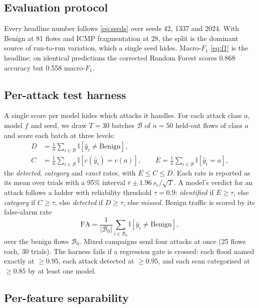 \documentclass[conference]{IEEEtran}
\begin{document}
\subsection{Evaluation protocol}

Every headline number follows \eqref{eq:seeds} over seeds 42, 1337 and 2024. With Benign at 81 flows and ICMP fragmentation at 28, the split is the dominant source of run-to-run variation, which a single seed hides. Macro-$F_1$ \eqref{eq:f1} is the headline: on identical predictions the corrected Random Forest scores 0.868 accuracy but 0.558 macro-$F_1$.

\subsection{Per-attack test harness}

A single score per model hides which attacks it handles. For each attack class $a$, model $f$ and seed, we draw $T = 30$ batches $\mathcal{B}$ of $n = 50$ held-out flows of class $a$ and score each batch at three levels:
\begin{align}
D &= \frac{1}{n}\sum_{i\in\mathcal{B}} \mathbb{I}[\hat{y}_i \ne \text{Benign}], \nonumber\\
C &= \frac{1}{n}\sum_{i\in\mathcal{B}} \mathbb{I}[c(\hat{y}_i) = c(a)], \qquad
E = \frac{1}{n}\sum_{i\in\mathcal{B}} \mathbb{I}[\hat{y}_i = a],
\label{eq:levels}
\end{align}
the \emph{detected}, \emph{category} and \emph{exact} rates, with $E \le C \le D$. Each rate is reported as its mean over trials with a 95\% interval $\bar{r} \pm 1.96\, s_r/\sqrt{T}$. A model's verdict for an attack follows a ladder with reliability threshold $\tau = 0.9$: \emph{identified} if $E \ge \tau$, else \emph{category} if $C \ge \tau$, else \emph{detected} if $D \ge \tau$, else \emph{missed}. Benign traffic is scored by its false-alarm rate
\begin{equation}
\text{FA} = \frac{1}{\lvert\mathcal{B}_0\rvert}\sum_{i\in\mathcal{B}_0}\mathbb{I}[\hat{y}_i \ne \text{Benign}],
\label{eq:fa}
\end{equation}
over the benign flows $\mathcal{B}_0$. Mixed campaigns send four attacks at once (25 flows each, 30 trials). The harness fails if a regression gate is crossed: each flood named exactly at $\ge 0.95$, each attack detected at $\ge 0.95$, and each scan categorised at $\ge 0.85$ by at least one model.

\subsection{Per-feature separability}
\end{document}
